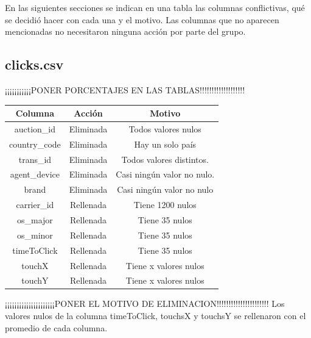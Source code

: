\documentclass{article}
\begin{document}
En las siguientes secciones se indican en una tabla las columnas conflictivas, qué se decidió hacer con cada una y el motivo. Las columnas que no aparecen mencionadas no necesitaron ninguna acción por parte del grupo.

\subsection{clicks.csv}

¡¡¡¡¡¡¡¡¡¡¡PONER PORCENTAJES EN LAS TABLAS!!!!!!!!!!!!!!!!!!!
\FloatBarrier
\begin{center}
        \begin{tabular}{ |c|c|c| }
          \hline
          Columna & Acción & Motivo \\
          \hline\hline
          auction\_id & Eliminada & Todos valores nulos \\
          \hline
          country\_code & Eliminada & Hay un solo país \\
          \hline
          trans\_id & Eliminada & Todos valores distintos. \\
          \hline
          agent\_device & Eliminada & Casi ningún valor no nulo. \\
          \hline
          brand & Eliminada & Casi ningún valor no nulo \\
          \hline
          carrier\_id & Rellenada & Tiene 1200 nulos \\
          \hline
          os\_major & Rellenada & Tiene 35 nulos \\
          \hline
          os\_minor & Rellenada & Tiene 35 nulos \\
          \hline
          timeToClick & Rellenada & Tiene 35 nulos \\
          \hline
          touchX & Rellenada & Tiene x valores nulos \\
          \hline
          touchY & Rellenada & Tiene x valores nulos \\
          \hline
        \end{tabular}
\end{center}
\FloatBarrier
¡¡¡¡¡¡¡¡¡¡¡¡¡¡¡¡¡¡¡¡¡PONER EL MOTIVO DE ELIMINACION!!!!!!!!!!!!!!!!!!!!!!
Los valores nulos de la columna timeToClick, touchsX y touchsY se rellenaron con el promedio de cada columna.
\end{document}
